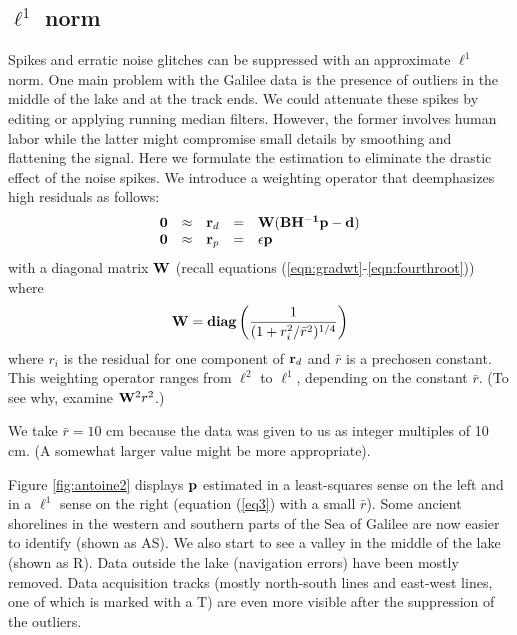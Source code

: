 \subsection{${\ell^1}$ norm}


Spikes and erratic noise glitches can be suppressed
with an approximate $\ell^1$ norm.
One main problem with the Galilee data is the presence of outliers
in the middle of the lake and at the track ends.
We could attenuate these spikes by editing or applying running median filters.
However, the former involves human labor
while the latter might compromise small details
by smoothing and flattening the signal.
Here we formulate the estimation
to eliminate the drastic effect of the noise spikes.
We introduce a weighting operator that deemphasizes high residuals as follows:
\begin{equation}
  \begin{array}{lllll}
    \bold 0 &\approx& \bold r_d &=& \bold W ( \bold B \bold {H^{-1}} \bold p - \bold d
    )\\
    \bold 0 &\approx&  \bold r_p &=& \epsilon \bold p
  \end{array} \label{eqn:eq3}
\end{equation}
with a diagonal matrix $\bf{W}$
(recall equations (\ref{eqn:gradwt}-\ref{eqn:fourthroot})) where
\begin{equation}
{\bf W} = {\bf diag} \left( \frac{1}{(1+r_i^2/\bar{r}^2)^{1/4}} \right)
\end{equation}
where $r_i$ is the residual for one component of $\bold r_d$
and $\bar{r}$ is a prechosen constant. This weighting operator
ranges from $\ell^2$ to $\ell^1$, depending on the constant $\bar{r}$.
(To see why, examine $\bold W^2 r^2$.)

\par
We take $\bar{r}=10$ cm
because the data was given to us as integer multiples of 10 cm.
(A somewhat larger value might be more appropriate).




\par
Figure \ref{fig:antoine2} displays ${\bf p}$ estimated 
in a least-squares sense on the left and in a $\ell^1$ sense on the right 
(equation (\ref{eq3}) with a small $\bar{r}$).
Some ancient shorelines in the western and southern parts of the Sea of
Galilee are now easier to identify (shown as AS).
We also start to see a valley in the middle of the lake (shown as R). 
Data outside the lake (navigation errors) have been mostly removed.
Data acquisition tracks (mostly north-south lines and east-west lines,
one of which is marked with a T)
are even more visible after the suppression of the outliers.

